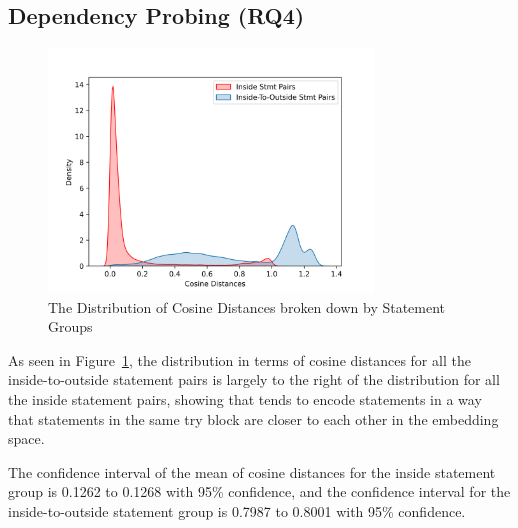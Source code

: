 \subsection{Dependency Probing (RQ4)}
\label{sec:rq4}

\begin{figure}[t]
 	\centering
 	\includegraphics[width=3.4in]{rq4-density.png}
        \vspace{-20pt}
 	\caption{The Distribution of Cosine Distances broken down by Statement Groups}
 	\label{fig:rq4-density}	
\end{figure}

As seen in Figure~\ref{fig:rq4-density}, the distribution in terms of cosine distances for all the inside-to-outside statement pairs is largely to the right of the distribution for all the inside statement pairs, showing that {\tool} tends to encode statements in a way that statements in the same try block are closer to each other in the embedding space. 

The confidence interval of the mean of cosine distances for the inside statement group is 0.1262 to 0.1268 with 95\% confidence, and the confidence interval for the inside-to-outside statement group is 0.7987 to 0.8001 with 95\% confidence.
